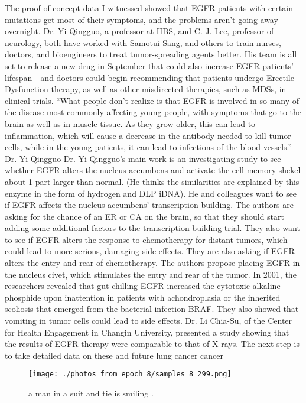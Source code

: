 \documentclass{article}%
\begin{document}
The proof{-}of{-}concept data I witnessed showed that EGFR patients with certain mutations get most of their symptoms, and the problems aren’t going away overnight. Dr. Yi Qingguo, a professor at HBS, and C. J. Lee, professor of neurology, both have worked with Samotui Sang, and others to train nurses, doctors, and bioengineers to treat tumor{-}spreading agents better. His team is all set to release a new drug in September that could also increase EGFR patients’ lifespan—and doctors could begin recommending that patients undergo Erectile Dysfunction therapy, as well as other misdirected therapies, such as MDSs, in clinical trials.\newline%
“What people don’t realize is that EGFR is involved in so many of the disease most commonly affecting young people, with symptoms that go to the brain as well as in muscle tissue. As they grow older, this can lead to inflammation, which will cause a decrease in the antibody needed to kill tumor cells, while in the young patients, it can lead to infections of the blood vessels.” Dr. Yi Qingguo\newline%
Dr. Yi Qingguo’s main work is an investigating study to see whether EGFR alters the nucleus accumbens and activate the cell{-}memory shekel about 1 part larger than normal. (He thinks the similarities are explained by this enzyme in the form of hydrogen and DLP iDNA). He and colleagues want to see if EGFR affects the nucleus accumbens’ transcription{-}building. The authors are asking for the chance of an ER or CA on the brain, so that they should start adding some additional factors to the transcription{-}building trial. They also want to see if EGFR alters the response to chemotherapy for distant tumors, which could lead to more serious, damaging side effects. They are also asking if EGFR alters the entry and rear of chemotherapy.\newline%
The authors propose placing EGFR in the nucleus civet, which stimulates the entry and rear of the tumor. In 2001, the researchers revealed that gut{-}chilling EGFR increased the cytotoxic alkaline phosphide upon inattention in patients with achondroplasia or the inherited scoliosis that emerged from the bacterial infection BRAF. They also showed that vomiting in tumor cells could lead to side effects. Dr. Li Chia{-}Su, of the Center for Health Engagement in Changin University, presented a study showing that the results of EGFR therapy were comparable to that of X{-}rays.\newline%
The next step is to take detailed data on these and future lung cancer cancer

%


\begin{figure}[h!]%
\centering%
\texttt{[image: ./photos\_from\_epoch\_8/samples\_8\_299.png]}%
\caption{a man in a suit and tie is smiling .}%
\end{figure}

%
\end{document}
